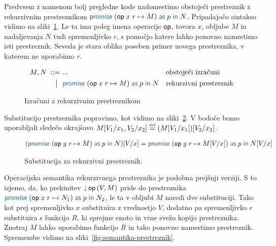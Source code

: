 Predvsem z namenom bolj pregledne kode nadomestimo obstoječi prestreznik z rekurzivnim prestreznikom $\tmwithrec{op}{x}{r}{M}{p}{N}$. Pripadajočo sintakso vidimo na sliki~\ref{fig:izrazi-prestreznik}. Le ta ima poleg imena operacije $\mathsf{op}$, tovora $x$, obljube $M$ in nadaljevanja $N$ tudi spremenljivko $r$, s pomočjo katere lahko ponovno namestimo isti prestreznik. Seveda je stara oblika poseben primer novega prestreznika, v katerem ne uporabimo $r$.


\begin{figure}[H]
	\centering
	\small
	\begin{align*}
		M, N
		\bnfis& ...                            & &\text{obstoječi izračuni} \\
		\bnfor& \tmwithrec{op}{x}{r}{M}{p}{N}  & &\text{rekurzivni prestreznik}
	\end{align*}
	
	\caption{Izračuni z rekurzivnim prestreznikom}
	\label{fig:izrazi-prestreznik}
\end{figure}

Substitucijo prestreznika popravimo, kot vidimo na sliki~\ref{fig:substitucija-prestreznik}. V bodoče bomo uporabljali sledečo okrajšavo $M[V_1/x_1, V_2/x_2] \mathrel{\overset{\text{\tiny def}}{=}} (M[V_1/x_1])[V_2/x_2]$.

\begin{figure}[H]
	\centering
	\small
	\begin{align*}
		(\tmwithrec{op}{y}{r}{M}{p}{N})[V/x] &= \tmwithrec{op}{y}{r}{M[V/x]}{p}{N[V/x]}
	\end{align*}
	\vspace{-5ex}
	\caption{Substitucija za rekurzivni prestreznik.}
	\label{fig:substitucija-prestreznik}
\end{figure}

Operacijska semantika rekurzivnega prestreznika je podobna prejšnji verziji. S to izjemo, da, ko prekinitev $\tmopin{op}{V}{M}$ pride do prestreznika $\tmwithrec{op}{x}{r}{N_1}{p}{N_2}$, le ta v obljubi $M$ naredi dve substituciji. Tako kot prej spremenljivko $x$ substituira z vrednostjo $V$, dodatno pa spremenljivko $r$ substituira s funkcijo $R$, ki sprejme enoto in vrne svežo kopijo prestreznika. Znotraj $M$ lahko uporabimo funkcijo $R$ in tako ponovno namestimo prestreznik. Spremembe vidimo na sliki~\ref{fig:semantika-prestreznik}.

